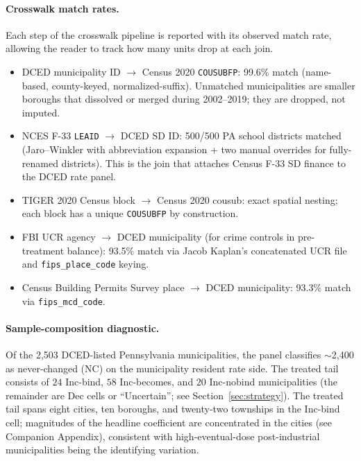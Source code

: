 \documentclass[12pt]{article}
\begin{document}
\paragraph{Crosswalk match rates.}
Each step of the crosswalk pipeline is reported with its observed
match rate, allowing the reader to track how many units drop at each
join.

\begin{itemize}
\item DCED municipality ID $\to$ Census 2020
  \texttt{COUSUBFP}: 99.6\% match (name-based, county-keyed,
  normalized-suffix). Unmatched municipalities are smaller boroughs that
  dissolved or merged during 2002--2019; they are dropped, not
  imputed.
\item NCES F-33 \texttt{LEAID} $\to$ DCED SD ID: 500/500
  PA school districts matched (Jaro--Winkler with abbreviation
  expansion + two manual overrides for fully-renamed districts).
  This is the join that attaches Census F-33 SD finance to the DCED
  rate panel.
\item TIGER 2020 Census block $\to$ Census 2020 cousub: exact
  spatial nesting; each block has a unique \texttt{COUSUBFP} by
  construction.
\item FBI UCR agency $\to$ DCED municipality (for crime controls in
  pre-treatment balance): 93.5\% match via Jacob Kaplan's
  concatenated UCR file \citep{kaplanUCR} and
  \texttt{fips\_place\_code} keying.
\item Census Building Permits Survey place $\to$ DCED municipality: 93.3\%
  match via \texttt{fips\_mcd\_code}.
\end{itemize}

\paragraph{Sample-composition diagnostic.}
Of the 2{,}503 DCED-listed Pennsylvania municipalities, the panel
classifies $\sim$2{,}400 as never-changed (NC) on the municipality resident
rate side. The treated tail consists of $24$ Inc-bind, $58$
Inc-becomes, and $20$ Inc-nobind municipalities (the remainder are Dec cells
or ``Uncertain''; see Section~\ref{sec:strategy}). The treated tail
spans eight cities, ten boroughs, and twenty-two townships in the
Inc-bind cell; magnitudes of the headline coefficient are
concentrated in the cities (see Companion Appendix), consistent
with high-eventual-dose post-industrial municipalities being the
identifying variation.

\end{document}
